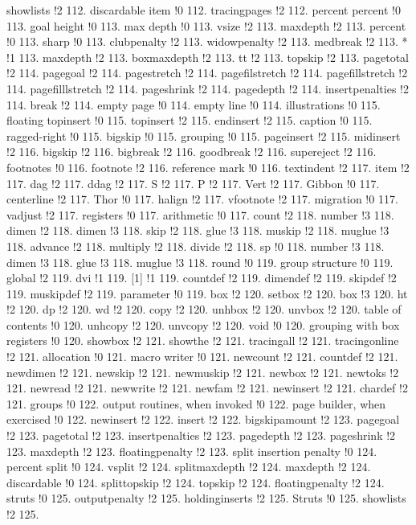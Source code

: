 showlists !2 112.
discardable item !0 112.
tracingpages !2 112.
percent percent !0 113.
goal height !0 113.
max depth !0 113.
vsize !2 113.
maxdepth !2 113.
percent !0 113.
sharp !0 113.
clubpenalty !2 113.
widowpenalty !2 113.
medbreak !2 113.
* !1 113.
maxdepth !2 113.
boxmaxdepth !2 113.
tt !2 113.
topskip !2 113.
pagetotal !2 114.
pagegoal !2 114.
pagestretch !2 114.
pagefilstretch !2 114.
pagefillstretch !2 114.
pagefilllstretch !2 114.
pageshrink !2 114.
pagedepth !2 114.
insertpenalties !2 114.
break !2 114.
empty page !0 114.
empty line !0 114.
illustrations !0 115.
floating topinsert !0 115.
topinsert !2 115.
endinsert !2 115.
caption !0 115.
ragged-right !0 115.
bigskip !0 115.
grouping !0 115.
pageinsert !2 115.
midinsert !2 116.
bigskip !2 116.
bigbreak !2 116.
goodbreak !2 116.
supereject !2 116.
footnotes !0 116.
footnote !2 116.
reference mark !0 116.
textindent !2 117.
item !2 117.
dag !2 117.
ddag !2 117.
S !2 117.
P !2 117.
Vert !2 117.
Gibbon !0 117.
centerline !2 117.
Thor !0 117.
halign !2 117.
vfootnote !2 117.
migration !0 117.
vadjust !2 117.
registers !0 117.
arithmetic !0 117.
count !2 118.
number !3 118.
dimen !2 118.
dimen !3 118.
skip !2 118.
glue !3 118.
muskip !2 118.
muglue !3 118.
advance !2 118.
multiply !2 118.
divide !2 118.
sp !0 118.
number !3 118.
dimen !3 118.
glue !3 118.
muglue !3 118.
round !0 119.
group structure !0 119.
global !2 119.
dvi !1 119.
[1] !1 119.
countdef !2 119.
dimendef !2 119.
skipdef !2 119.
muskipdef !2 119.
parameter !0 119.
box !2 120.
setbox !2 120.
box !3 120.
ht !2 120.
dp !2 120.
wd !2 120.
copy !2 120.
unhbox !2 120.
unvbox !2 120.
table of contents !0 120.
unhcopy !2 120.
unvcopy !2 120.
void !0 120.
grouping with box registers !0 120.
showbox !2 121.
showthe !2 121.
tracingall !2 121.
tracingonline !2 121.
allocation !0 121.
macro writer !0 121.
newcount !2 121.
countdef !2 121.
newdimen !2 121.
newskip !2 121.
newmuskip !2 121.
newbox !2 121.
newtoks !2 121.
newread !2 121.
newwrite !2 121.
newfam !2 121.
newinsert !2 121.
chardef !2 121.
groups !0 122.
output routines, when invoked !0 122.
page builder, when exercised !0 122.
newinsert !2 122.
insert !2 122.
bigskipamount !2 123.
pagegoal !2 123.
pagetotal !2 123.
insertpenalties !2 123.
pagedepth !2 123.
pageshrink !2 123.
maxdepth !2 123.
floatingpenalty !2 123.
split insertion penalty !0 124.
percent split !0 124.
vsplit !2 124.
splitmaxdepth !2 124.
maxdepth !2 124.
discardable !0 124.
splittopskip !2 124.
topskip !2 124.
floatingpenalty !2 124.
struts !0 125.
outputpenalty !2 125.
holdinginserts !2 125.
Struts !0 125.
showlists !2 125.
